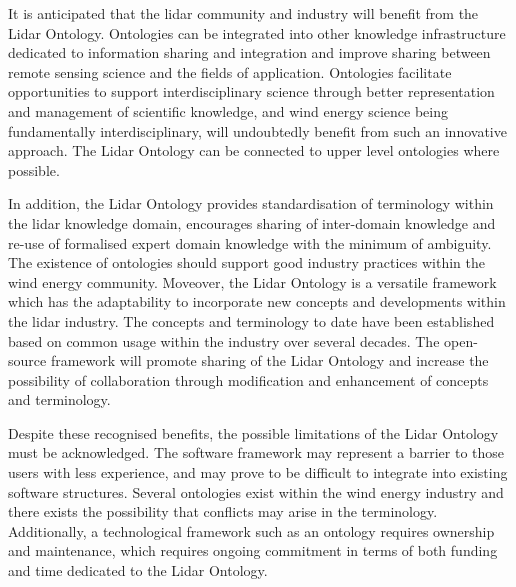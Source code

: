 \documentclass[remotesensing,article,submit,pdftex,moreauthors]{Definitions/mdpi}
\begin{document}
It is anticipated that the lidar community and industry will benefit from the Lidar Ontology.
Ontologies can be integrated into other knowledge infrastructure dedicated to information sharing and integration and improve sharing between remote sensing science and the fields of application. Ontologies facilitate opportunities to support interdisciplinary science through better representation and management of scientific knowledge, and wind energy science being fundamentally interdisciplinary, will undoubtedly benefit from such an innovative approach. The Lidar Ontology can be connected to upper level ontologies where possible.

In addition, the Lidar Ontology provides standardisation of terminology within the lidar knowledge domain, encourages sharing of inter-domain knowledge and re-use of formalised expert domain knowledge with the minimum of ambiguity. The existence of ontologies should support good industry practices within the wind energy community. Moveover, the Lidar Ontology is a versatile framework which has the adaptability to incorporate new concepts and developments within the lidar industry.
The concepts and terminology to date have been established based on common usage within the industry over several decades.
The open-source framework will promote sharing of the Lidar Ontology and increase the possibility of collaboration through modification and enhancement of concepts and terminology. 

Despite these recognised benefits, the possible limitations of the Lidar Ontology must be acknowledged.
The software framework may represent a barrier to those users with less experience, and may prove to be difficult to integrate into existing software structures.
Several ontologies exist within the wind energy industry and there exists the possibility that conflicts may arise in the terminology.
Additionally, a technological framework such as an ontology requires ownership and maintenance, which requires ongoing commitment in terms of both funding and time dedicated to the Lidar Ontology.
\end{document}
